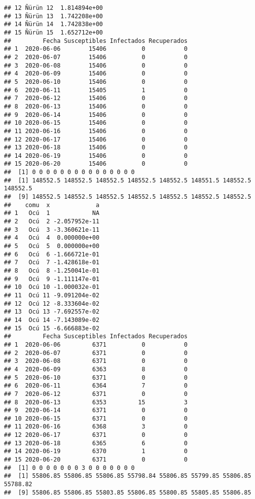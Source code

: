 \documentclass[
]{article}
\begin{document}
\begin{verbatim}
## 12 Ñürün 12  1.814894e+00
## 13 Ñürün 13  1.742208e+00
## 14 Ñürün 14  1.742838e+00
## 15 Ñürün 15  1.652712e+00
##         Fecha Susceptibles Infectados Recuperados
## 1  2020-06-06        15406          0           0
## 2  2020-06-07        15406          0           0
## 3  2020-06-08        15406          0           0
## 4  2020-06-09        15406          0           0
## 5  2020-06-10        15406          0           0
## 6  2020-06-11        15405          1           0
## 7  2020-06-12        15406          0           0
## 8  2020-06-13        15406          0           0
## 9  2020-06-14        15406          0           0
## 10 2020-06-15        15406          0           0
## 11 2020-06-16        15406          0           0
## 12 2020-06-17        15406          0           0
## 13 2020-06-18        15406          0           0
## 14 2020-06-19        15406          0           0
## 15 2020-06-20        15406          0           0
##  [1] 0 0 0 0 0 0 0 0 0 0 0 0 0 0 0
##  [1] 148552.5 148552.5 148552.5 148552.5 148552.5 148551.5 148552.5 148552.5
##  [9] 148552.5 148552.5 148552.5 148552.5 148552.5 148552.5 148552.5
##    comu  x             a
## 1   Ocú  1            NA
## 2   Ocú  2 -2.057952e-11
## 3   Ocú  3 -3.360621e-11
## 4   Ocú  4  0.000000e+00
## 5   Ocú  5  0.000000e+00
## 6   Ocú  6 -1.666721e-01
## 7   Ocú  7 -1.428618e-01
## 8   Ocú  8 -1.250041e-01
## 9   Ocú  9 -1.111147e-01
## 10  Ocú 10 -1.000032e-01
## 11  Ocú 11 -9.091204e-02
## 12  Ocú 12 -8.333604e-02
## 13  Ocú 13 -7.692557e-02
## 14  Ocú 14 -7.143089e-02
## 15  Ocú 15 -6.666883e-02
##         Fecha Susceptibles Infectados Recuperados
## 1  2020-06-06         6371          0           0
## 2  2020-06-07         6371          0           0
## 3  2020-06-08         6371          0           0
## 4  2020-06-09         6363          8           0
## 5  2020-06-10         6371          0           0
## 6  2020-06-11         6364          7           0
## 7  2020-06-12         6371          0           0
## 8  2020-06-13         6353         15           3
## 9  2020-06-14         6371          0           0
## 10 2020-06-15         6371          0           0
## 11 2020-06-16         6368          3           0
## 12 2020-06-17         6371          0           0
## 13 2020-06-18         6365          6           0
## 14 2020-06-19         6370          1           0
## 15 2020-06-20         6371          0           0
##  [1] 0 0 0 0 0 0 0 3 0 0 0 0 0 0 0
##  [1] 55806.85 55806.85 55806.85 55798.84 55806.85 55799.85 55806.85 55788.82
##  [9] 55806.85 55806.85 55803.85 55806.85 55800.85 55805.85 55806.85

\end{verbatim}
\end{document}
